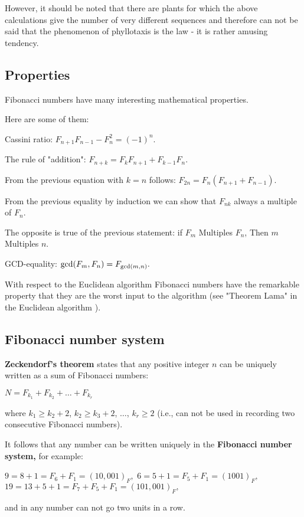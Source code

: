 However, it should be noted that there are plants for which the above calculations give the number of very different sequences and therefore can not be said that the phenomenon of phyllotaxis is the law - it is rather amusing tendency.

\subsection{ Properties }

Fibonacci numbers have many interesting mathematical properties.

Here are some of them:

Cassini ratio:
$F_ {n +1} F_ {n-1} - F_n ^ 2 = (-1) ^ n.$

The rule of "addition":
$F_ {n + k} = F_k F_ {n +1} + F_ {k-1} F_n.$

From the previous equation with $k = n$ follows:
$F_ {2n} = F_n (F_ {n +1} + F_ {n-1}).$

From the previous equality by induction we can show that
$F_ {nk}$ always a multiple of $F_n$.

The opposite is true of the previous statement:
if $F_m$ Multiples $F_n$, Then $m$ Multiples $n$.

GCD-equality:
${\rm gcd} (F_m, F_n) = F_ {{\rm gcd} (m, n)}.$

With respect to the Euclidean algorithm Fibonacci numbers have the remarkable property that they are the worst input to the algorithm (see "Theorem Lama" in the Euclidean algorithm ).
\subsection{ Fibonacci number system }

\textbf{Zeckendorf's theorem} states that any positive integer $n$ can be uniquely written as a sum of Fibonacci numbers:

$N = F_ {k_1} + F_ {k_2} + \ldots + F_ {k_r}$

where $k_1 \ge k_2 +2$, $k_2 \ge k_3 +2$, $\ldots$, $k_r \ge 2$ (i.e., can not be used in recording two consecutive Fibonacci numbers).

It follows that any number can be written uniquely in the \textbf{Fibonacci number system,} for example:

$9 = 8 +1 = F_6 + F_1 = (10,001) _F,$
$6 = 5 +1 = F_5 + F_1 = (1001) _F,$
$19 = 13 +5 +1 = F_7 + F_5 + F_1 = (101,001) _F,$

and in any number can not go two units in a row.


